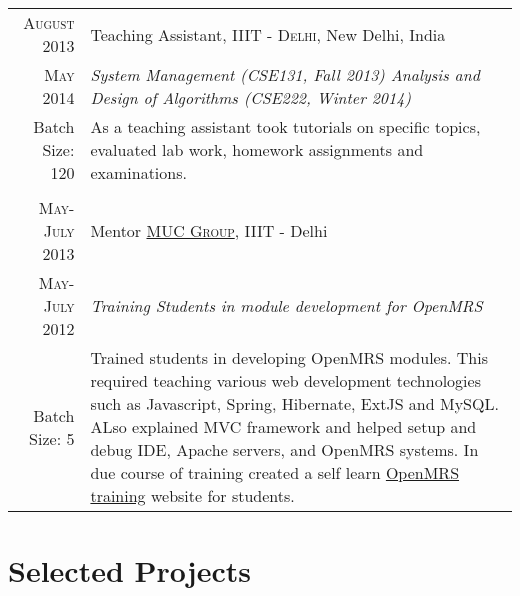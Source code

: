 \documentclass[a4paper,10pt]{article} %
\begin{document}
\begin{tabular}{r|p{13cm}}

\textsc{August 2013 } & Teaching Assistant, \textsc{ IIIT - Delhi}, New Delhi, India \\
\textsc{May 2014} & \emph{System Management (CSE131, Fall 2013) \newline Analysis and Design of Algorithms (CSE222, Winter 2014)}\\ 
Batch Size: 120 & \small{As a teaching assistant took tutorials on specific topics, evaluated lab work, homework \newline assignments and examinations.}\\
\multicolumn{2}{c}{} \\

\textsc{May-July 2013} & Mentor \href{http://muc.iiitd.edu.in/muc/}{\textsc{MUC Group}}, IIIT - Delhi \emph{}\\
\textsc{May-July 2012} & \emph{Training Students in module development for OpenMRS}\\ 
Batch Size: 5& \small{Trained students in developing OpenMRS modules. This required teaching various web development technologies such as Javascript, Spring, Hibernate, ExtJS and MySQL. ALso explained  MVC framework and helped setup and debug IDE, Apache servers, and OpenMRS systems. In due course of training created a self learn \href{https://sites.google.com/a/iiitd.ac.in/openmrs-iiitd/}{OpenMRS training} website for students.}


\end{tabular}




\section{\color{red} Selected Projects}
\end{document}
